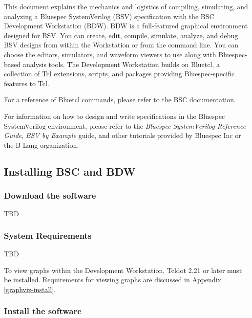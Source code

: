 \documentclass{article}
\begin{document}
\label{sec-intro}

This document explains the mechanics and logistics of compiling,
simulating, and analyzing a Bluespec SystemVerilog (BSV)
specification with the BSC Development Workstation (BDW).
BDW is a full-featured graphical 
environment  designed for BSV. You can create, edit,
compile,  simulate, analyze, and
debug  BSV designs from within the Workstation or from the
command line.   You can choose the
editors, simulators, and waveform viewers to  use along with
Bluespec-based analysis tools. The Development
Workstation builds on  Bluetcl, a collection of Tcl extensions,
scripts, and packages providing Bluespec-specific features to Tcl.

For a reference of Bluetcl commands, please refer to the BSC
documentation.

For information on how to design and write specifications in the
Bluespec SystemVerilog environment, please refer to the
{\em Bluespec SystemVerilog Reference Guide}, {\em BSV by Example} guide,
and other tutorials provided by Bluespec Inc or the B-Lang organization.


\subsection{Installing BSC and BDW}
\label{sec-installation}


\subsubsection{Download the software}

TBD


\subsubsection{System Requirements}

TBD

To view graphs within the Development Workstation,
Tcldot 2.21 or later must be installed.  Requirements for viewing graphs
are discussed in Appendix \ref{graphviz-install}. 


\subsubsection{Install the software}
\end{document}
